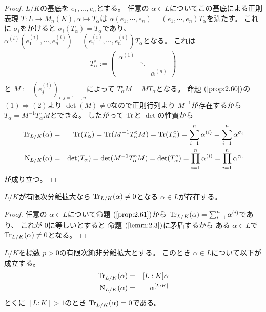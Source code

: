 \documentclass[../master_galois_theory]{subfiles}
\begin{document}
\begin{proof}
  $L/K$の基底を $e_1 , \dots , e_n$とする。
  任意の $\alpha \in L$についてこの基底による正則表現
  $T : L \longrightarrow M_n(K) , \alpha \longmapsto T_\alpha$は
  $\alpha (e_1 , \cdots , e_n) = (e_1 , \cdots , e_n) T_\alpha$を満たす。
  これに $\sigma_i$をかけると $\sigma_i(T_\alpha) = T_\alpha$であり、
  $\alpha^{(i)} (e_1^{(i)} , \cdots , e_n^{(i)}) = (e_1^{(i)} , \cdots , e_n^{(i)}) T_\alpha$となる。
  これは
  \begin{eqnarray*}
    T_\alpha^\circ :=
    \begin{pmatrix}
      \alpha^{(1)} &        & \\
                   & \ddots & \\
                   &        & \alpha^{(n)}
    \end{pmatrix}
    \\
  \end{eqnarray*}
  と $M := (e_j^{(i)})_{i , j = 1 , \dots , n}$によって
  $T_\alpha^\circ M = M T_\alpha$となる。
  命題 $(\mathrm{\ref{prop:2.60}})$の $(1) \Rightarrow (2)$より
  $\det(M) \neq 0$なので正則行列より $M^{-1}$が存在するから
  $T_\alpha = M^{-1} T_\alpha^\circ M$とできる。
  したがって $\mathrm{Tr}$と $\det$の性質から
  \begin{eqnarray*}
    \mathrm{Tr}_{L/K}(\alpha) & = & \mathrm{Tr}(T_\alpha) = \mathrm{Tr}(M^{-1} T_\alpha^\circ M) = \mathrm{Tr}(T_\alpha^\circ) = \sum_{i=1}^n \alpha^{(i)} = \sum_{i=1}^n \alpha^{\sigma_i} \\
    \mathrm{N}_{L/K}(\alpha) & = & \det(T_\alpha) = \det(M^{-1} T_\alpha^\circ M) = \det(T_\alpha^\circ) = \prod_{i=1}^n \alpha^{(i)} = \prod_{i=1}^n \alpha^{\alpha_i}
  \end{eqnarray*}
  が成り立つ。
\end{proof}

\begin{corl} \label{corl:bunritracenorm}
  $L/K$が有限次分離拡大なら $\mathrm{Tr}_{L/K}(\alpha) \neq 0$となる $\alpha \in L$が存在する。
\end{corl}

\begin{proof}
  任意の $\alpha \in L$について命題 $(\mathrm{\ref{prop:2.61}})$から
  $\mathrm{Tr}_{L/K}(\alpha) = \sum_{i=1}^n \alpha^{(i)}$であり、
  これが $0$に等しいとすると
  命題 $(\mathrm{\ref{lemm:2.3}})$に矛盾するから
  ある $\alpha \in L$で $\mathrm{Tr}_{L/K}(\alpha) \neq 0$となる。
\end{proof}

\begin{lemm} \label{lemm:hibunritracenorm}
  $L/K$を標数 $p > 0$の有限次純非分離拡大とする。
  このとき $\alpha \in L$について以下が成立する。
  \begin{eqnarray*}
    \mathrm{Tr}_{L/K}(\alpha) & = & [L:K]\alpha \\
    \mathrm{N}_{L/K}(\alpha) & = & \alpha^{[L:K]}
  \end{eqnarray*}
  とくに $[L:K] > 1$のとき $\mathrm{Tr}_{L/K}(\alpha) = 0$である。
\end{lemm}
\end{document}
